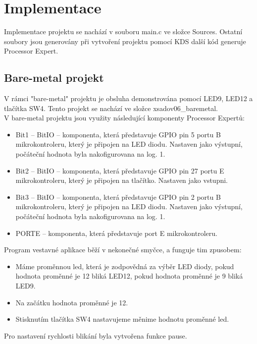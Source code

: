 \documentclass[11pt,a4paper]{article}
\begin{document}
\section{Implementace}
    
    Implementace projektu se nachází v souboru main.c ve složce Sources. Ostatní soubory jsou generovány při vytvoření projektu pomocí KDS další kód generuje Processor Expert.

    \subsection{Bare-metal projekt}
    V rámci "bare-metal" projektu je obsluha demonstrována pomocí LED9, LED12 a tlačítka SW4. Tento projekt se nachází ve složce xsadov06\_baremetal.\\

    V bare-metal projektu jsou využity následující komponenty Processor Expertů:
    \begin{itemize}
        \item Bit1 – BitIO – komponenta, která představuje GPIO pin 5 portu B mikrokontroleru, který je            připojen na LED diodu. Nastaven jako výstupní, počáteční hodnota byla nakofigurovana na log. 1.
        \item Bit2 – BitIO – komponenta, která představuje GPIO pin 27 portu E mikrokontroleru, který je           připojen na tlačítko. Nastaven jako vstupni.
        \item Bit3 – BitIO – komponenta, která představuje GPIO pin 2 portu B mikrokontroleru, který je            připojen na LED diodu. Nastaven jako výstupní, počáteční hodnota byla nakofigurovana na log. 1.
        \item PORTE – komponenta, která představuje port E mikrokontroleru.
    \end{itemize}
    Program vestavné aplikace běží v nekonečné smyčce, a funguje tim zpusobem:        
        \begin{itemize}
        \item Máme proměnnou led, která je zodpovědná za výběr LED diody, pokud hodnota proměnné je 12 bliká       LED12, pokud hodnota proměnné je 9 bliká LED9.
        \item Na začátku hodnota proměnné je 12.
        \item Stisknutím tlačítka SW4 nastavujeme měnime hodnotu proměnné led.
    \end{itemize}
    Pro nastavení rychlosti blikání byla vytvořena funkce pause.
    
\end{document}
